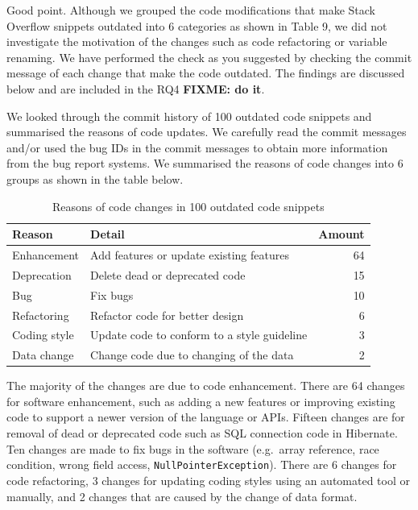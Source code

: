 \documentclass[a4paper,twoside,10pt]{reviewresponse}
\newcommand\FIXME[1]{{\color{red}\textbf{FIXME: #1}}}
\begin{document}
		

Good point. Although we grouped the code modifications that make Stack Overflow snippets outdated into 6 categories as shown in Table 9, we did not investigate the motivation of the changes such as code refactoring or variable renaming. We have performed the check as you suggested by checking the commit message of each change that make the code outdated. The findings are discussed below and are included in the RQ4 \FIXME{do it}.

We looked through the commit history of 100 outdated code snippets and summarised the reasons of code updates. We carefully read the commit messages and/or used the bug IDs in the commit messages to obtain more information from the bug report systems. We summarised the reasons of code changes into 6 groups as shown in the table below.

\begin{table}
	\centering
	\begin{tabular}{llr}
		\toprule
		Reason & Detail & Amount \\
		\midrule
		Enhancement & Add features or update existing features & 64 \\
		Deprecation & Delete dead or deprecated code & 15 \\
		Bug & Fix bugs & 10 \\
		Refactoring & Refactor code for better design & 6 \\
		Coding style & Update code to conform to a style guideline & 3 \\
		Data change & Change code due to changing of the data & 2 \\
		\bottomrule
	\end{tabular}
	\caption{Reasons of code changes in 100 outdated code snippets}
\end{table}

The majority of the changes are due to code enhancement. There are 64 changes for software enhancement, such as adding a new features or improving existing code to support a newer version of the language or APIs. Fifteen changes are for removal of dead or deprecated code such as SQL connection code in Hibernate. Ten changes are made to fix bugs in the software (e.g.~array reference, race condition, wrong field access, \texttt{NullPointerException}). There are 6 changes for code refactoring, 3 changes for updating coding styles using an automated tool or manually, and 2 changes that are caused by the change of data format.
\end{document}
